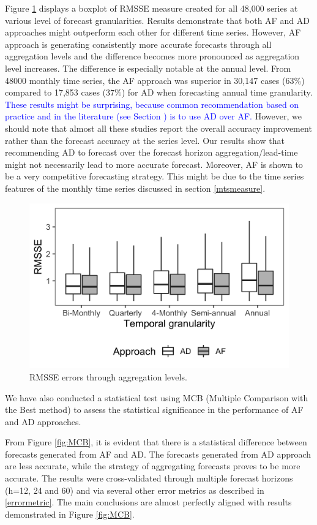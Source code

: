 \documentclass[preprint, 3p,
authoryear]{elsarticle} %
\begin{document}
Figure \ref{fig:RMSSE} displays a boxplot of RMSSE measure created for
all 48,000 series at various level of forecast granularities. Results
demonstrate that both AF and AD approaches might outperform each other
for different time series. However, AF approach is generating
consistently more accurate forecasts through all aggregation levels and
the difference becomes more pronounced as aggregation level increases.
The difference is especially notable at the annual level. From 48000
monthly time series, the AF approach was superior in 30,147 cases
(\(63\%\)) compared to 17,853 cases (\(37\%\)) for AD when forecasting
annual time granularity.
\textcolor{blue}{These results might be surprising, because common recommendation based on practice and in the literature (see Section ) is to use AD over AF.}
However, we should note that almost all these studies report the overall
accuracy improvement rather than the forecast accuracy at the series
level. Our results show that recommending AD to forecast over the
forecast horizon aggregation/lead-time might not necessarily lead to
more accurate forecast. Moreover, AF is shown to be a very competitive
forecasting strategy. This might be due to the time series features of
the monthly time series discussed in section \ref{mtsmeasure}.

\begin{figure}[H]

{\centering \includegraphics[width=0.7\linewidth]{img/300dpi/box_plot_rmsse} 

}

\caption{RMSSE errors through aggregation levels.}\label{fig:RMSSE}
\end{figure}

We have also conducted a statistical test using MCB (Multiple Comparison
with the Best method) \citep{MCB} to assess the statistical significance
in the performance of AF and AD approaches.

From Figure \ref{fig:MCB}, it is evident that there is a statistical
difference between forecasts generated from AF and AD. The forecasts
generated from AD approach are less accurate, while the strategy of
aggregating forecasts proves to be more accurate. The results were
cross-validated through multiple forecast horizons (h=12, 24 and 60) and
via several other error metrics as described in \ref{errormetric}. The
main conclusions are almost perfectly aligned with results demonstrated
in Figure \ref{fig:MCB}.
\end{document}
